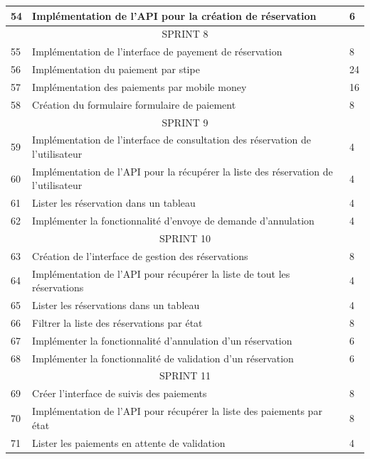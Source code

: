 \documentclass[12pt]{report}
\begin{document}
\begin{longtable}{|p{1cm}|p{7cm}|p{6cm}|}
						\hline
						54 & Implémentation de l'API pour la création de réservation & 6\\
						\hline
						\multicolumn{3}{|c|}{SPRINT 8}\\
						\hline
						55 & Implémentation de l'interface de payement de réservation & 8\\
						\hline
						56 & Implémentation du paiement par stipe & 24\\
						\hline
						57 & Implémentation des paiements par mobile money & 16\\
						\hline
						58 & Création du formulaire formulaire de paiement & 8\\
						\hline
						\multicolumn{3}{|c|}{SPRINT 9}\\
						\hline
						59 & Implémentation de l'interface de consultation des réservation de l'utilisateur & 4\\
						\hline
						60 & Implémentation de l'API pour la récupérer la liste des réservation de l'utilisateur & 4\\
						\hline
						61 & Lister les réservation dans un tableau & 4\\
						\hline
						62 & Implémenter la fonctionnalité d'envoye de demande d'annulation & 4\\
						\hline
						\multicolumn{3}{|c|}{SPRINT 10}\\
						\hline						
						63 & Création de l'interface de gestion des réservations & 8\\
						\hline
						64 & Implémentation de l'API pour récupérer la liste de tout les réservations & 4\\
						\hline
						65 & Lister les réservations dans un tableau & 4\\
						\hline
						66 & Filtrer la liste des réservations par état & 8\\
						\hline
						67 & Implémenter la fonctionnalité d'annulation d'un réservation & 6\\
						\hline
						68 & Implémenter la fonctionnalité de validation d'un réservation & 6\\
						\hline
						\multicolumn{3}{|c|}{SPRINT 11}\\
						\hline						
						69 & Créer l'interface de suivis des paiements & 8\\
						\hline
						70 & Implémentation de l'API pour récupérer la liste des paiements par état & 8\\
						\hline
						71 & Lister les paiements en attente de validation & 4\\

\end{longtable}
\end{document}
